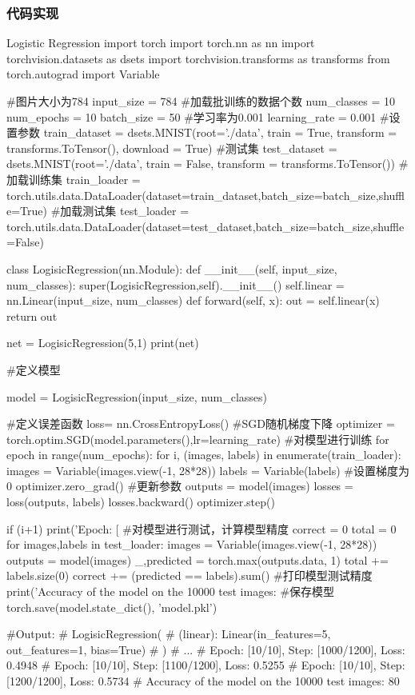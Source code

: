 \documentclass[openbib]{article}
\begin{document}
\subsubsection{代码实现}
	\begin{Python}{Logistic Regression}
import torch
import torch.nn as nn
import torchvision.datasets as dsets
import torchvision.transforms as transforms
from torch.autograd import Variable


#图片大小为784
input_size = 784
#加载批训练的数据个数
num_classes = 10
num_epochs = 10
batch_size = 50
#学习率为0.001
learning_rate = 0.001
#设置参数
train_dataset = dsets.MNIST(root='./data', train = True, transform = transforms.ToTensor(), download = True)
#测试集
test_dataset = dsets.MNIST(root='./data', train = False, transform = transforms.ToTensor())
#加载训练集
train_loader = torch.utils.data.DataLoader(dataset=train_dataset,batch_size=batch_size,shuffle=True)
#加载测试集
test_loader = torch.utils.data.DataLoader(dataset=test_dataset,batch_size=batch_size,shuffle=False)

class LogisicRegression(nn.Module):
def __init__(self, input_size, num_classes):
super(LogisicRegression,self).__init__()
self.linear = nn.Linear(input_size, num_classes)
def forward(self, x):
out = self.linear(x)
return out

net = LogisicRegression(5,1)
print(net)

#定义模型

model = LogisicRegression(input_size, num_classes)

#定义误差函数
loss= nn.CrossEntropyLoss()
#SGD随机梯度下降
optimizer = torch.optim.SGD(model.parameters(),lr=learning_rate)
#对模型进行训练
for epoch in range(num_epochs):
	for i, (images, labels) in enumerate(train_loader):
		images = Variable(images.view(-1, 28*28))
		labels = Variable(labels)
#设置梯度为0
		optimizer.zero_grad()
#更新参数
		outputs = model(images)
		losses = loss(outputs, labels)
		losses.backward()
		optimizer.step()

		if (i+1)%
			print('Epoch: [%
#对模型进行测试，计算模型精度
correct = 0
total = 0
for images,labels in test_loader:
	images = Variable(images.view(-1, 28*28))
outputs = model(images)
_,predicted = torch.max(outputs.data, 1)
total += labels.size(0)
correct += (predicted == labels).sum()
#打印模型测试精度
print('Accuracy of the model on the 10000 test images: %
#保存模型
torch.save(model.state_dict(), 'model.pkl')

#Output:
#		LogisicRegression(
#		(linear): Linear(in_features=5, out_features=1, bias=True)
#		)
#		...
#		Epoch: [10/10], Step: [1000/1200], Loss: 0.4948
#		Epoch: [10/10], Step: [1100/1200], Loss: 0.5255
#		Epoch: [10/10], Step: [1200/1200], Loss: 0.5734
#		Accuracy of the model on the 10000 test images: 80 %
	\end{Python}
\end{document}
